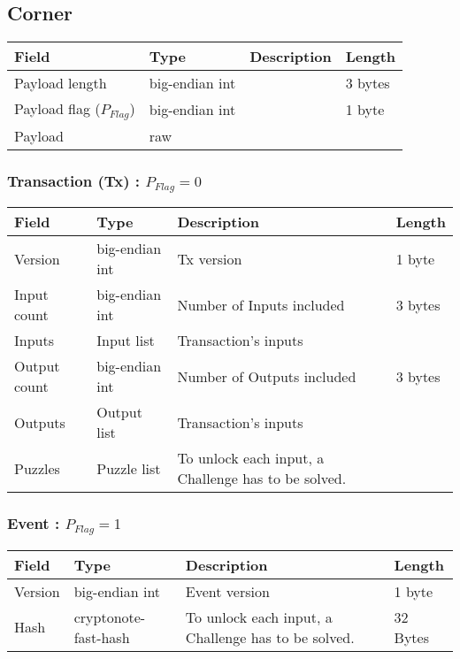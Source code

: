 \documentclass[a4paper,10pt]{article}
\begin{document}
        \subsection{Corner}
           \begin{tabularx}{\textwidth}{|l|l|X|l|}
            \hline Field & Type & Description & Length \\ \hline
            \hline Payload length & big-endian int &  & 3 bytes \\
            \hline Payload flag ($P_{Flag}$) & big-endian int &  & 1 byte \\
            \hline Payload & raw & & \\
            \hline
            \end{tabularx}
            \subsubsection{Transaction (Tx) :  $P_{Flag} = 0$}
                \begin{tabularx}{\textwidth}{|l|l|X|l|}
                \hline Field & Type & Description & Length \\ \hline
                \hline Version & big-endian int & Tx version & 1 byte \\
                \hline Input count & big-endian int & Number of Inputs included & 3 bytes\\
                \hline Inputs & Input list & Transaction's inputs & \\
                \hline Output count & big-endian int & Number of Outputs included & 3 bytes\\
                \hline Outputs & Output list & Transaction's inputs & \\
                \hline Puzzles & Puzzle list & To unlock each input, a Challenge has to be solved. & \\
                \hline
                \end{tabularx}
            \subsubsection{Event : $P_{Flag} = 1$}
                \begin{tabularx}{\textwidth}{|l|l|X|l|}
                \hline Field & Type & Description & Length \\ \hline
                \hline Version & big-endian int & Event version & 1 byte \\
                \hline Hash & cryptonote-fast-hash & To unlock each input, a Challenge has to be solved. & 32 Bytes\\
                \hline
                \end{tabularx}
\end{document}
